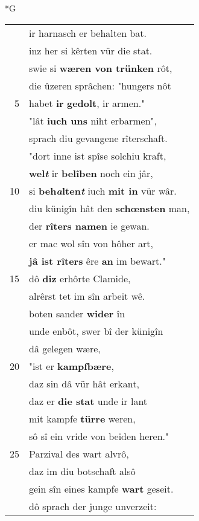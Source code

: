 \documentclass[8pt,a4paper,notitlepage]{article}
\begin{document}
\begin{table}[ht]
\begin{minipage}[t]{0.5\linewidth}
\small
\begin{center}*G
\end{center}
\begin{tabular}{rl}
 & ir harnasch er behalten bat.\\ 
 & inz her si kêrten vür die stat.\\ 
 & swie si \textbf{wæren von trünken} rôt,\\ 
 & die ûzeren sprâchen: "hungers nôt\\ 
5 & habet \textbf{ir} \textbf{gedolt}, ir armen."\\ 
 & "lât \textbf{iuch uns} niht erbarmen",\\ 
 & sprach diu gevangene rîterschaft.\\ 
 & "dort inne ist spîse solchiu kraft,\\ 
 & \textbf{wel\textit{t}} ir \textbf{belîben} noch ein jâr,\\ 
10 & si \textbf{beh\textit{a}lten\textit{t}} iuch \textbf{mit in} vür wâr.\\ 
 & diu künigîn hât den \textbf{schœnsten} man,\\ 
 & der \textbf{rîters namen} ie gewan.\\ 
 & er mac wol sîn von hôher art,\\ 
 & \textbf{jâ ist rîters} êre \textbf{an} im bewart."\\ 
15 & dô \textbf{diz} erhôrte Clamide,\\ 
 & alrêrst tet im sîn arbeit wê.\\ 
 & boten sander \textbf{wider} în\\ 
 & unde enbôt, swer bî der künigîn\\ 
 & dâ gelegen wære,\\ 
20 & "ist er \textbf{kampfbære},\\ 
 & daz sin dâ vür hât erkant,\\ 
 & daz er \textbf{die stat} unde ir lant\\ 
 & mit kampfe \textbf{türre} weren,\\ 
 & sô sî ein vride von beiden heren."\\ 
25 & Parzival des wart alvrô,\\ 
 & daz im diu botschaft alsô\\ 
 & gein sîn eines kampfe \textbf{wart} geseit.\\ 
 & dô sprach der junge unverzeit:\\ 

\end{tabular}
\end{minipage}
\end{table}
\end{document}
